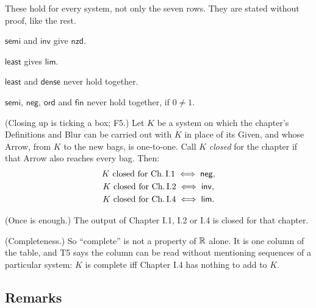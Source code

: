 These hold for every system, not only the seven rows. They are stated without proof, like the rest.
\begin{lines}
\item[\lab{T1}] $\mathsf{semi}$ and $\mathsf{inv}$ give $\mathsf{nzd}$.
\item[\lab{T2}] $\mathsf{least}$ gives $\mathsf{lim}$.
\item[\lab{T3}] $\mathsf{least}$ and $\mathsf{dense}$ never hold together.
\item[\lab{T4}] $\mathsf{semi}$, $\mathsf{neg}$, $\mathsf{ord}$ and $\mathsf{fin}$ never hold together, if $0 \neq 1$.
\item[\lab{T5}] (Closing up is ticking a box; F5.) Let $K$ be a system on which the chapter's Definitions and Blur can be carried out with $K$ in place of its Given, and whose Arrow, from $K$ to the new bags, is one-to-one. Call $K$ \emph{closed} for the chapter if that Arrow also reaches every bag. Then:
\begin{gather*}
K \text{ closed for Ch.\,I.1} \iff \mathsf{neg}, \\
K \text{ closed for Ch.\,I.2} \iff \mathsf{inv}, \\
K \text{ closed for Ch.\,I.4} \iff \mathsf{lim}.
\end{gather*}
\item[\lab{T6}] (Once is enough.) The output of Chapter I.1, I.2 or I.4 is closed for that chapter.
\item[\lab{T7}] (Completeness.) So ``complete'' is not a property of $\mathbb{R}$ alone. It is one column of the table, and T5 says the column can be read without mentioning sequences of a particular system: $K$ is complete iff Chapter I.4 has nothing to add to $K$.
\end{lines}

\subsection*{Remarks}


